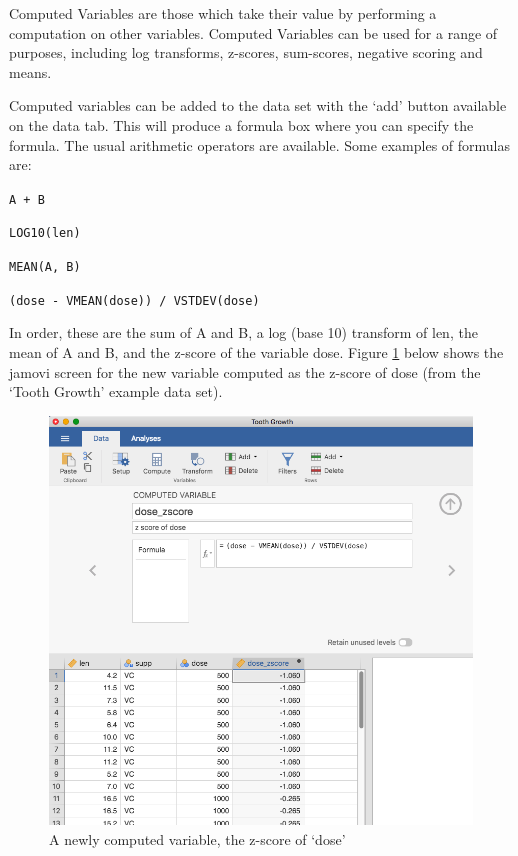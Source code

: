 \documentclass[
]{book}
\begin{document}
Computed Variables are those which take their value by performing a computation on other variables. Computed Variables can be used for a range of purposes, including log transforms, z-scores, sum-scores, negative scoring and means.

Computed variables can be added to the data set with the `add' button available on the data tab. This will produce a formula box where you can specify the formula. The usual arithmetic operators are available. Some examples of formulas are:

\texttt{A\ +\ B}

\texttt{LOG10(len)}

\texttt{MEAN(A,\ B)}

\texttt{(dose\ -\ VMEAN(dose))\ /\ VSTDEV(dose)}

In order, these are the sum of A and B, a log (base 10) transform of len, the mean of A and B, and the z-score of the variable dose. Figure \ref{fig:computedvariable} below shows the jamovi screen for the new variable computed as the z-score of dose (from the `Tooth Growth' example data set).

\begin{figure}
\includegraphics[width=11.56in]{img/introj/computedvariable} \caption{A newly computed variable, the z-score of ‘dose’}\label{fig:computedvariable}
\end{figure}
\end{document}
